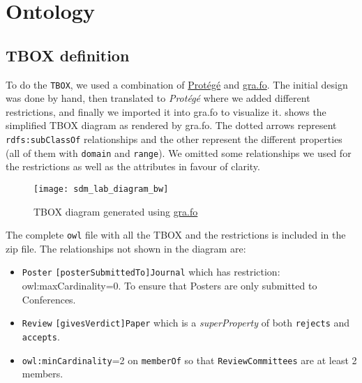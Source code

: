 
\section{Ontology}%
\label{sec:ontology}

\subsection{TBOX definition}%
\label{sub:tbox}


To do the \texttt{TBOX}, we used a combination of \href{https://protege.stanford.edu/}{Protégé} and
\href{https://gra.fo}{gra.fo}. The initial design was done by hand, then translated to \emph{Protégé} where
we added different restrictions, and finally we imported it into gra.fo to visualize it.
 shows the simplified TBOX diagram as rendered by gra.fo. The dotted arrows represent
\texttt{rdfs:subClassOf} relationships and the other represent the different properties (all of
them with \texttt{domain} and \texttt{range}).  We omitted some relationships we used for the restrictions
as well as the attributes in favour of clarity.

\begin{figure}[H]
\texttt{[image: sdm\_lab\_diagram\_bw]}
\caption{TBOX diagram generated using \url{gra.fo}}%
\label{fig:tbox_diagram}
\end{figure}

\pagebreak
The complete \texttt{owl} file with all the TBOX and the restrictions is included in the
zip file. The relationships not shown in the diagram are:
\begin{itemize}
\item \texttt{Poster} \rightarrow \texttt{[posterSubmittedTo]}\rightarrow \texttt{Journal} which has
    restriction: owl:maxCardinality=0. To ensure that Posters are only submitted to Conferences.
\item \texttt{Review} \rightarrow \texttt{[givesVerdict]}\rightarrow \texttt{Paper} which is
    a \emph{superProperty} of both \texttt{rejects} and \texttt{accepts}.
\item \texttt{owl:minCardinality}=2 on \texttt{memberOf} so that \texttt{ReviewCommittees} are at least
    2 members.
\end{itemize}

